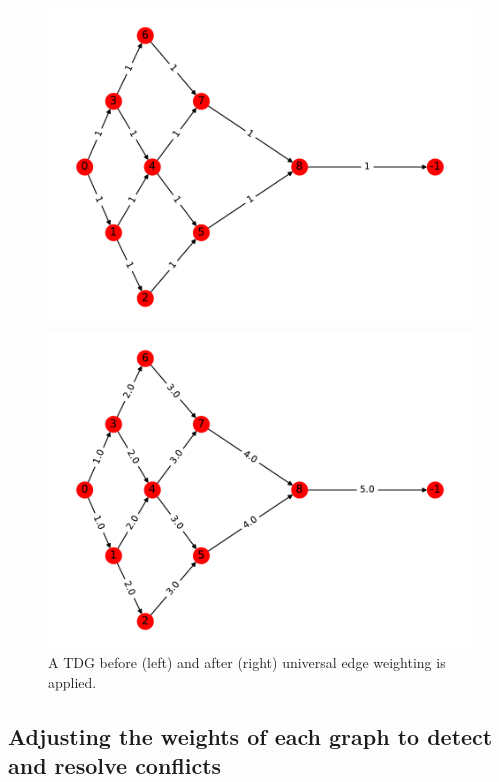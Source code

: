 \begin{figure}[H]
  \begin{minipage}[c]{0.5\textwidth}
    \centering
    \includegraphics[scale=0.5]{../../figures/G_pre_universal.pdf}
  \end{minipage}
  \begin{minipage}[c]{0.5\textwidth}
    \centering
    \includegraphics[scale=0.5]{../../figures/G_universal.pdf}
  \end{minipage}
  \caption{A TDG before (left) and after (right) universal edge weighting is applied.}
   \label{universal}
\end{figure}

\subsection{Adjusting the weights of each graph to detect and resolve conflicts}

